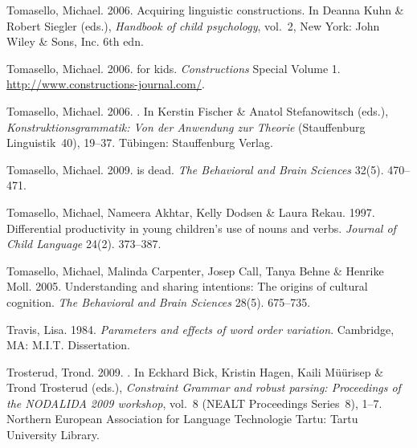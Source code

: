 \begin{thebibliography}{1420}
Tomasello, Michael. 2006{}.
\newblock Acquiring linguistic constructions.
\newblock In Deanna Kuhn \& Robert Siegler (eds.), \emph{Handbook of child
  psychology}, vol.~2, New York: John Wiley \& Sons, Inc. 6th edn.

Tomasello, Michael. 2006{}.
 for kids.
\newblock \emph{Constructions} Special Volume 1.
\newblock \urlprefix\url{http://www.constructions-journal.com/}.

Tomasello, Michael. 2006{}.
.
\newblock In Kerstin Fischer \& Anatol Stefanowitsch (eds.),
  \emph{{Konstruktionsgrammatik: Von der Anwendung zur Theorie}} (Stauffenburg
  Linguistik~40), 19--37. T{\"u}bingen: Stauffenburg Verlag.

Tomasello, Michael. 2009.
 is dead.
\newblock \emph{The Behavioral and Brain Sciences} 32(5). 470--471.

Tomasello, Michael, Nameera Akhtar, Kelly Dodsen \& Laura Rekau. 1997.
\newblock Differential productivity in young children's use of nouns and verbs.
\newblock \emph{Journal of Child Language} 24(2). 373--387.

Tomasello, Michael, Malinda Carpenter, Josep Call, Tanya Behne \& Henrike Moll.
  2005.
\newblock Understanding and sharing intentions: {The} origins of cultural
  cognition.
\newblock \emph{The Behavioral and Brain Sciences} 28(5). 675--735.

Travis, Lisa. 1984.
\newblock \emph{Parameters and effects of word order variation}.
\newblock Cambridge, MA: M.I.T. Dissertation.

Trosterud, Trond. 2009.
.
\newblock In Eckhard Bick, Kristin Hagen, Kaili M{\"u}{\"u}risep \& Trond
  Trosterud (eds.), \emph{{Constraint Grammar} and robust parsing: Proceedings
  of the {NODALIDA 2009} workshop}, vol.~8 (NEALT Proceedings Series~8), 1--7.
  Northern European Association for Language Technologie Tartu: Tartu
  University Library.


\end{thebibliography}
